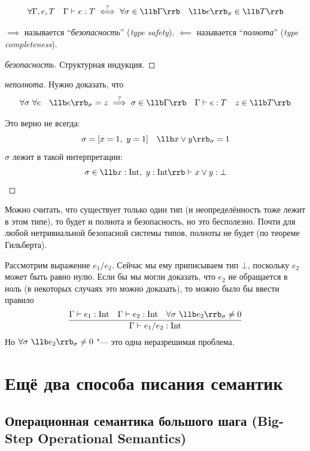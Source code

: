\begin{statement}
	$$ \forall \Gamma, e, T \quad \Gamma \vdash e : T \stackrel?\iff
	\forall \sigma \in \llb \Gamma \rrb \quad \llb e \rrb_\sigma \in \llb T \rrb $$
\end{statement}

$ \implies $ называется ``\emph{безопасность}'' (\emph{type safety}).
$ \impliedby $ называется ``\emph{полнота}'' (\emph{type completeness}).

\begin{proof}[безопасность]
	Структурная индукция.
\end{proof}

\begin{proof}[неполнота]
	Нужно доказать, что
	$$ \forall \sigma ~ \forall e \quad \llb e \rrb_\sigma = z \stackrel?\implies
	\sigma \in \llb \Gamma \rrb \quad \Gamma \vdash e : T \quad z \in \llb T \rrb $$

	Это верно не всегда:
	$$ \sigma = [x = 1, ~ y = 1] \quad \llb x \vee y \rrb_\sigma = 1 $$
	$ \sigma $ лежит в такой интерпретации:
	$$ \sigma \in \llb x : \text{Int}, ~ y : \text{Int} \rrb \vdash x \vee y : \bot $$
\end{proof}

Можно считать, что существует только один тип (и неопределённость тоже лежит в этом типе), то будет
и полнота и безопасность, но это бесполезно.
Почти для любой нетривиальной безопасной системы типов, полноты не будет (по теореме Гильберта).

Рассмотрим выражение $ e_1 / e_2 $.
Сейчас мы ему приписываем тип $ \bot $, поскольку $ e_2 $ может быть равно нулю.
Если бы мы могли доказать, что $ e_2 $ не обращается в ноль (в некоторых случаях это можно
доказать), то можно было бы ввести правило
$$ \frac{\Gamma \vdash e_1 : \text{Int} \quad \Gamma \vdash e_2 : \text{Int} \quad \forall \sigma ~
\llb e_2 \rrb_\sigma \ne 0}{\Gamma \vdash e_1/e_2 : \text{Int}} $$
Но $ \forall \sigma ~ \llb e_2 \rrb_\sigma \ne 0 $ "--- это одна неразрешимая проблема.

\section{Ещё два способа писания семантик}

\subsection[Операционная семантика большого шага]
{Операционная семантика большого шага (\textenglish{Big-Step Operational Semantics})}


